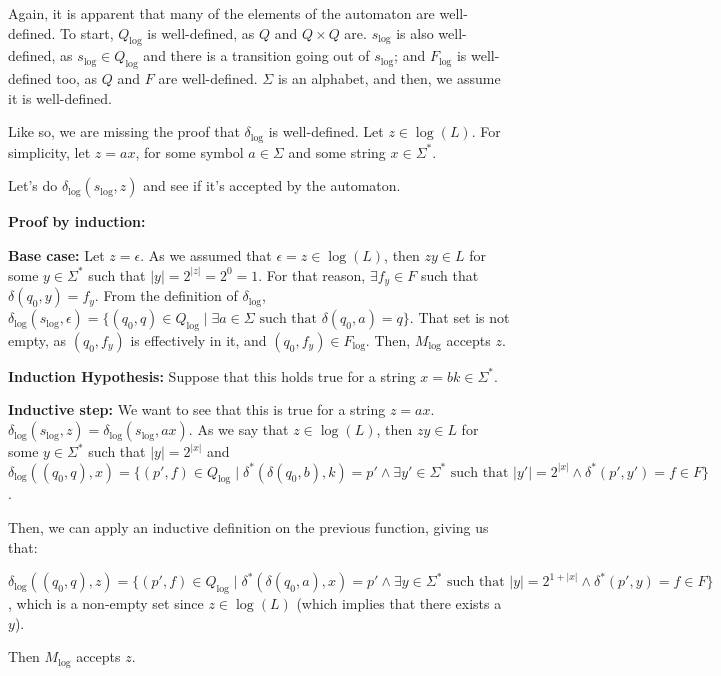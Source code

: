 \documentclass[12pt]{article}
\begin{document}
Again, it is apparent that many of the elements of the automaton are well-defined. To start, $Q_{\text{log}}$ is well-defined, as $Q$ and $Q \times Q$ are. $s_{\text{log}}$ is also well-defined, as $s_{\text{log}} \in Q_{\text{log}}$ and there is a transition going out of $s_{\text{log}}$; and $F_{\text{log}}$ is well-defined too, as $Q$ and $F$ are well-defined. $\Sigma$ is an alphabet, and then, we assume it is well-defined.

Like so, we are missing the proof that $\delta_{\text{log}}$ is well-defined. Let $z \in \log(L)$. For simplicity, let $z = ax$, for some symbol $a \in \Sigma$ and some string $x \in \Sigma^*$.

Let's do $\delta_{\text{log}} (s_{\text{log}}, z)$ and see if it's accepted by the automaton.

\textbf{Proof by induction:}

\textbf{Base case:} Let $z = \epsilon$. As we assumed that $\epsilon = z \in \log(L)$, then $zy \in L$ for some $y \in \Sigma^*$ such that $|y| = 2^{|z|} = 2^0 = 1$. For that reason, $\exists f_y \in F$ such that $\delta(q_0, y) = f_y$. From the definition of $\delta_{\text{log}}$, $\delta_{\text{log}} (s_{\text{log}}, \epsilon) = \{(q_0, q) \in Q_{\text{log}} \mid \exists a \in \Sigma \text{ such that } \delta(q_0, a) = q\}$. That set is not empty, as $(q_0, f_y)$ is effectively in it, and $(q_0, f_y) \in F_{\text{log}}$. Then, $M_{\text{log}}$ accepts $z$.

\textbf{Induction Hypothesis:} Suppose that this holds true for a string $x = bk \in \Sigma^*$.

\textbf{Inductive step:} We want to see that this is true for a string $z = ax$. $\delta_{\text{log}} (s_{\text{log}}, z) = \delta_{\text{log}} (s_{\text{log}}, ax)$. As we say that $z \in \log(L)$, then $zy \in L$ for some $y \in \Sigma^*$ such that $|y| = 2^{|x|}$ and $\delta_{\text{log}} ((q_0, q), x) = \{(p', f) \in Q_{\text{log}} \mid \delta^*(\delta(q_0, b), k) = p' \land \exists y' \in \Sigma^* \text{ such that } |y'| = 2^{|x|} \land \delta^*(p', y') = f \in F\}$.

Then, we can apply an inductive definition on the previous function, giving us that:

$\delta_{\text{log}} ((q_0, q), z) = \{(p', f) \in Q_{\text{log}} \mid \delta^*(\delta(q_0, a), x) = p' \land \exists y \in \Sigma^* \text{ such that } |y| = 2^{1+|x|} \land \delta^*(p', y) = f \in F\}$, which is a non-empty set since $z \in \log(L)$ (which implies that there exists a $y$).

Then $M_{\text{log}}$ accepts $z$.
    
\end{document}
